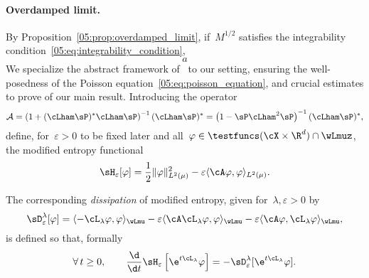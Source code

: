 \paragraph{Overdamped limit.}
By Proposition~\ref{05:prop:overdamped_limit}, if~$M^{1/2}$ satisfies the integrability condition~\eqref{05:eq:integrability_condition}, 
\begin{equation}
    a
\end{equation}
\label{05:app:technical_results}
We specialize the abstract framework of~ to our setting, ensuring the well-posedness of the Poisson equation~\eqref{05:eq:poisson_equation}, and crucial estimates to prove of our main result.
Introducing the operator
\begin{equation}
    \label{05:eq:hypocoercivity_A}
    \mathcal A = \left(1+(\cLham\sP)^*\cLham\sP\right)^{-1}(\cLham\sP)^* = \left(1-\sP\cLham^2\sP\right)^{-1}(\cLham\sP)^*,
\end{equation}
define, for~$\varepsilon>0$ to be fixed later and all~$\varphi\in \testfuncs(\cX\times\R^d)\cap \wLmuz$, the modified entropy functional
\begin{equation}
    \label{05:eq:mod_entropy}
    \sH_\varepsilon[\varphi] = \frac12\|\varphi\|^2_{L^2(\mu)} - \varepsilon\langle \cA\varphi,\varphi\rangle_{L^2(\mu)}.
\end{equation}

The corresponding \textit{dissipation} of modified entropy, given for~$\lambda,\varepsilon>0$ by
\begin{equation}
    \label{05:eq:dissipation_mod_entropy}
    \sD_\varepsilon^\lambda[\varphi] = \langle -\cL_\lambda\varphi,\varphi\rangle_{\wLmu} - \varepsilon\langle\cA\cL_\lambda\varphi,\varphi\rangle_{\wLmu} - \varepsilon\langle \cA \varphi,\cL_\lambda\varphi\rangle_{\wLmu},
\end{equation}
is defined so that, formally
\begin{equation}
    \label{05:eq:dissipation_ode}
    \forall\,t\geq 0,\qquad\frac{\d}{\d t}\sH_\varepsilon\left[\e^{t\cL_\lambda}\varphi\right] = -\sD_\varepsilon^\lambda[\e^{t\cL_\lambda}\varphi].
\end{equation}


